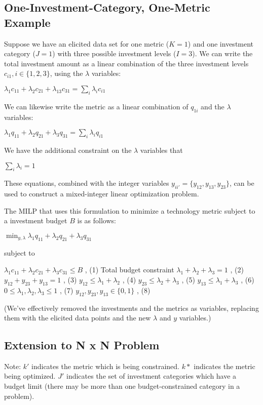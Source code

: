 \documentclass[letterpaper,10pt,english]{sphinxmanual}
\begin{document}
\subsection{One-Investment-Category, One-Metric Example}
\label{\detokenize{doc-src/optimizers:one-investment-category-one-metric-example}}
Suppose we have an elicited data set for one metric (\(K = 1\)) and one investment category (\(J = 1\)) with three possible investment levels (\(I = 3\)). We can write the total investment amount as a linear combination of the three investment levels \(c_{i1}, i \in \{1, 2, 3\}\), using the \(\lambda\) variables:

\(\lambda_{1}c_{11} + \lambda_{2}c_{21} + \lambda_{13}c_{31} = \sum_{i} \lambda_{i}c_{i1}\)

We can likewise write the metric as a linear combination of \(q_{1i}\) and the \(\lambda\) variables:

\(\lambda_{1}q_{11} + \lambda_{2}q_{21} + \lambda_{3}q_{31} = \sum_{i} \lambda_{i}q_{i1}\)

We have the additional constraint on the \(\lambda\) variables that

\(\sum_{i} \lambda_{i} = 1\)

These equations, combined with the integer variables \(y_{ii'} = \{ y_{12}, y_{13}, y_{23} \}\), can be used to construct a mixed-integer linear optimization problem.

The MILP that uses this formulation to minimize a technology metric subject to a investment budget \(B\) is as follows:

\(\min_{y, \lambda} \lambda_{1}q_{11} + \lambda_{2}q_{21} + \lambda_{3}q_{31}\)

subject to

\(\lambda_{1}c_{11} + \lambda_{2}c_{21} + \lambda_{3}c_{31} \leq B\) , (1) Total budget constraint
\(\lambda_1 + \lambda_2 + \lambda_3 = 1\) , (2)
\(y_{12} + y_{23} + y_{13} = 1\) , (3)
\(y_{12} \leq \lambda_1 + \lambda_2\) , (4)
\(y_{23} \leq \lambda_2 + \lambda_3\) , (5)
\(y_{13} \leq \lambda_1 + \lambda_3\) , (6)
\(0 \leq \lambda_1, \lambda_2, \lambda_3 \leq 1\) , (7)
\(y_{12}, y_{23}, y_{13} \in \{ 0, 1 \}\) , (8)

(We’ve effectively removed the investments and the metrics as variables, replacing them with the elicited data points and the new \(\lambda\) and \(y\) variables.)


\subsection{Extension to N x N Problem}
\label{\detokenize{doc-src/optimizers:extension-to-n-x-n-problem}}
Note: \(k'\) indicates the metric which is being constrained. \(k*\) indicates the metric being optimized. \(J'\) indicates the set of investment categories which have a budget limit (there may be more than one budget-constrained category in a problem).
\end{document}

